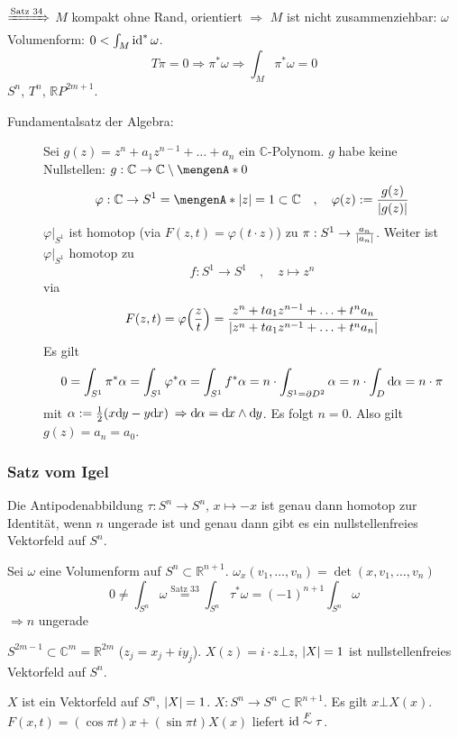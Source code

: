 $\xRightarrow{\text{Satz 34}}$ $M$ kompakt ohne Rand, orientiert $\Rightarrow $ $M$ ist nicht zusammenziehbar: $\omega$ Volumenform: $0 < \int_M \id^* \omega$.
\[
	T \pi = 0 \Rightarrow \pi^* \omega \Rightarrow \int_M \pi^* \omega =0
\]
$S^n$, $T^n$, $\mathds{R}P^{2m+1}$.
\begin{description}
	\item[Fundamentalsatz der Algebra:] Sei $g(z)= z^n + a_1 z^{n-1} + \ldots + a_n$ ein $\mathds{C}$-Polynom. $g$ habe keine Nullstellen: 
	$g : \mathds{C} \to \mathds{C} \setminus \set{0} $
	\[
		\varphi : \mathds{C} \to S^1 = \set{\abs*{z}=1 } \subset \mathds{C} \quad , \quad \varphi(z) := \frac{g(z)}{\abs*{g(z)}}  
	\]
	$\varphi\big|_{S^1}$ ist homotop (via $F(z,t)= \varphi(t \cdot z)$) zu $\pi : S^1 \to \frac{a_n}{\abs{a_n}}$. Weiter ist $\varphi \big|_{S^1}$ homotop zu
	\[
		f : S^1 \to S^1 \quad , \quad z \mapsto z^n
	\]
	via 
	\[
		F(z,t)= \varphi \enbrace*{\frac{z}{t}} = \frac{z^n + t a_1 z^{n-1} + \ldots + t^n a_n}{ \abs*{z^n + t a_1 z^{n-1} + \ldots + t^n a_n} } 
	\]
	Es gilt 
	\[
		 0 = \int_{S^1} \pi^* \alpha = \int_{S^1} \varphi^* \alpha = \int_{S^1} f^* \alpha = n \cdot \int_{S^1= \partial D^2} \alpha = n \cdot \int_{D} \mathd \alpha
		 = n \cdot \pi 
	\]
	mit $\alpha := \frac{1}{2}(x \mathd y - y \mathd x) $ $\Rightarrow \mathd \alpha= \mathd x \wedge\mathd y$. Es folgt $n=0$. Also gilt $g(z)= a_n = a_0$.
\end{description}

\subsubsection{Satz vom Igel} %
\label{ssub:623}
Die Antipodenabbildung $\tau  : S^n \to S^n$, $x \mapsto -x$ ist genau dann homotop zur Identität, wenn $n$ ungerade ist und genau dann gibt es ein nullstellenfreies 
Vektorfeld auf $S^n$.
\begin{description}
	\item[$\tau \sim \id$:] Sei $\omega$ eine Volumenform auf $S^n \subset \mathds{R}^{n+1}$. $\omega_x(v_1, \ldots , v_n) = \det (x, v_1, \ldots , v_n)$
	\[
		0 \not= \int_{S^n} \omega \stackrel{\text{Satz 33}}{=} \int_{S^n} \tau^* \omega = (-1)^{n+1} \int_{S^n} \omega
	\]
	$\Rightarrow n$ ungerade
	\item[$n=2m-1$:] $S^{2m-1} \subset \mathds{C}^m = \mathds{R}^{2m}$ ($z_j = x_j + i y_j$). $X(z) = i \cdot z \bot z$, $\abs*{X}=1 $ ist nullstellenfreies Vektorfeld auf
	$S^n$.
	\item $X$ ist ein Vektorfeld auf $S^n$, $\abs*{X}=1 $. $X : S^n \to S^n \subset \mathds{R}^{n+1}$. Es gilt $x \bot X(x)$.
	$F(x,t) = (\cos \pi t) x + (\sin \pi t) X(x)$ liefert $\id \stackrel{F}{\sim} \tau$. \bewende
\end{description}

